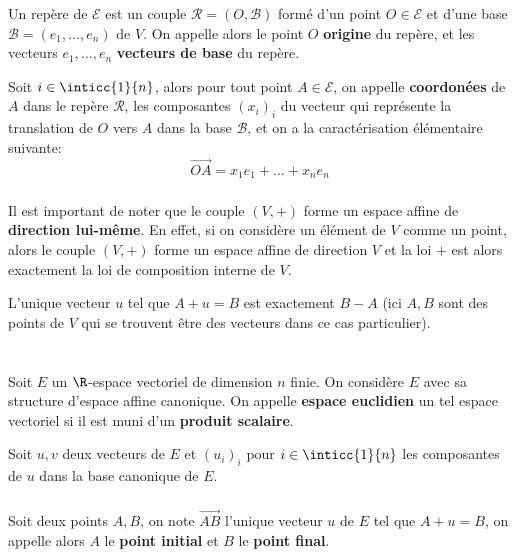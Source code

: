 \subsection*{}
Un repère de \(\mathscr{E}\) est un couple \(\mathscr{R} = (O, \mathscr{B})\) formé d'un point \(O \in \mathscr{E}\) et d'une base \(\mathscr{B} = (e_1, \ldots, e_n)\) de \(V\). On appelle alors le point \(O\) \textbf{origine} du repère, et les vecteurs \(e_1, \ldots, e_n\) \textbf{vecteurs de base} du repère.\<

Soit \(i\in\inticc{1}{n}\), alors pour tout point \(A \in \mathscr{E}\), on appelle \textbf{coordonées} de \(A\) dans le repère \(\mathscr{R}\), les composantes \((x_i)_i\) du vecteur qui représente la translation de \(O\) vers \(A\) dans la base \(\mathscr{B}\), et on a la caractérisation élémentaire suivante:
\[
   \overrightarrow{OA} = x_1e_1 + \ldots + x_ne_n 
\]

\subsection*{}
Il est important de noter que le couple \((V, +)\) forme un espace affine de \textbf{direction lui-même}. En effet, si on considère un élément de \(V\) comme un point, alors le couple  \((V, +)\) forme un espace affine de direction \(V\) et la loi \(+\) est alors exactement la loi de composition interne de \(V\).\<

L'unique vecteur \(u\) tel que \(A + u = B\) est exactement \(B - A\) (ici \(A, B\) sont des points de \(V\) qui se trouvent être des vecteurs dans ce cas particulier). \<\<

\chapter*{}
Soit \(E\) un \(\R\)-espace vectoriel de dimension \(n\) finie. On considère \(E\) avec sa structure d'espace affine canonique.
On appelle \textbf{espace euclidien} un tel espace vectoriel si il est muni d'un \textbf{produit scalaire}.\<

Soit \(u, v\) deux vecteurs de \(E\) et \((u_i)_i\) pour \(i \in \inticc{1}{n}\) les composantes de \(u\) dans la base canonique de \(E\).

\subsection*{}
Soit deux points \(A, B\), on note \(\overrightarrow{AB}\) l'unique vecteur \(u\) de \(E\) tel que \(A + u = B\), on appelle alors \(A\) le \textbf{point initial} et \(B\) le \textbf{point final}. \<

